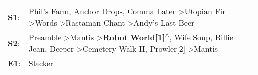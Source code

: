 \begin{supertabular}{p{0.03\textwidth}p{0.92\textwidth}}
 \textbf{S1}:  &                                                                                   Phil's Farm\textsuperscript{}, \enspace Anchor Drops\textsuperscript{}, \enspace Comma Later\textsuperscript{} \textgreater \enspace Utopian Fir\textsuperscript{} \textgreater \enspace Words\textsuperscript{} \textgreater \enspace Rastaman Chant\textsuperscript{} \textgreater \enspace Andy's Last Beer\textsuperscript{}  \enspace  \\
 \textbf{S2}:  &  Preamble\textsuperscript{} \textgreater \enspace Mantis\textsuperscript{} \textgreater \enspace \textbf{Robot World[1]\textsuperscript{$\wedge$}}, \enspace Wife Soup\textsuperscript{}, \enspace Billie Jean\textsuperscript{}, \enspace Deeper\textsuperscript{} \textgreater \enspace Cemetery Walk II\textsuperscript{}, \enspace Prowler[2]\textsuperscript{} \textgreater \enspace Mantis\textsuperscript{}  \enspace  \\
 \textbf{E1}:  &                                                                                                                                                                                                                                                                                                                                                                                          Slacker\textsuperscript{}  \enspace  \\
\end{supertabular}
